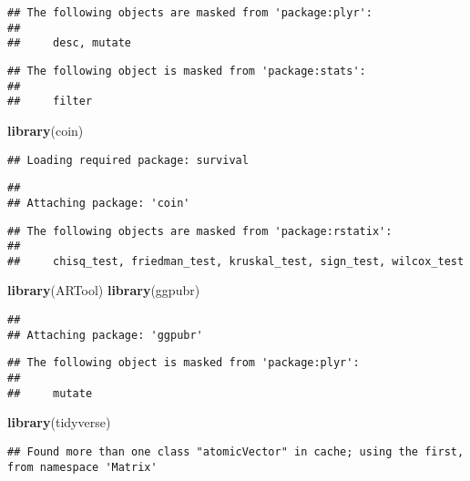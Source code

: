 \documentclass[
]{article}
\newenvironment{Shaded}{\begin{snugshade}}{\end{snugshade}}
\newcommand{\KeywordTok}[1]{\textcolor[rgb]{0.13,0.29,0.53}{\textbf{#1}}}
\newcommand{\NormalTok}[1]{#1}
\begin{document}
\begin{verbatim}
## The following objects are masked from 'package:plyr':
## 
##     desc, mutate
\end{verbatim}

\begin{verbatim}
## The following object is masked from 'package:stats':
## 
##     filter
\end{verbatim}

\begin{Shaded}
\begin{Highlighting}[]
\KeywordTok{library}\NormalTok{(coin)}
\end{Highlighting}
\end{Shaded}

\begin{verbatim}
## Loading required package: survival
\end{verbatim}

\begin{verbatim}
## 
## Attaching package: 'coin'
\end{verbatim}

\begin{verbatim}
## The following objects are masked from 'package:rstatix':
## 
##     chisq_test, friedman_test, kruskal_test, sign_test, wilcox_test
\end{verbatim}

\begin{Shaded}
\begin{Highlighting}[]
\KeywordTok{library}\NormalTok{(ARTool)}
\KeywordTok{library}\NormalTok{(ggpubr)}
\end{Highlighting}
\end{Shaded}

\begin{verbatim}
## 
## Attaching package: 'ggpubr'
\end{verbatim}

\begin{verbatim}
## The following object is masked from 'package:plyr':
## 
##     mutate
\end{verbatim}

\begin{Shaded}
\begin{Highlighting}[]
\KeywordTok{library}\NormalTok{(tidyverse)}
\end{Highlighting}
\end{Shaded}

\begin{verbatim}
## Found more than one class "atomicVector" in cache; using the first, from namespace 'Matrix'
\end{verbatim}
\end{document}

